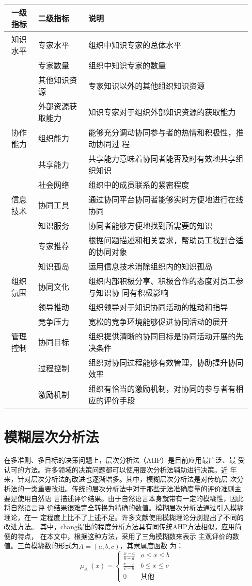 \documentclass[adobefonts]{ctexart}
\begin{document}
  \begin{supertabular}[center]{clp{6.5cm}}
\hline
    一级指标&二级指标&说明\\\hline
    知识水平&专家水平&组织中知识专家的总体水平\\
          &专家数量&组织中知识专家的数量    \\
          &其他知识资源&专家知识以外的其他组织知识资源\\
          &外部资源获取能力&知识专家对于组织外部知识资源的获取能力 \\
    协作能力&组织能力&能够充分调动协同参与者的热情和积极性，推动协同过
    程 \\
          &共享能力&共享能力意味着协同者能否及时有效地共享组织知识\\
          &社会网络&组织中的成员联系的紧密程度\\
    信息技术&协同工具&通过协同平台协同者能够实时方便地进行在线协同\\
          &知识服务&协同者能够方便地找到所需要的知识\\
          &专家推荐&根据问题描述和相关要求，帮助员工找到合适的协同对象\\
          &知识孤岛&运用信息技术消除组织内的知识孤岛\\
    组织氛围&协同文化&组织内部积极分享、积极合作的态度对员工参与知识协
    同有积极影响\\
          &领导推动&组织领导对于知识协同活动的推动和指导\\
          &竞争压力&宽松的竞争环境能够促进协同活动的展开\\
    管理控制&协同目标&组织提供清晰的协同目标是协同活动开展的先决条件\\
          &过程控制&组织对协同过程能够有效管理，协助提升协同效率\\
          &激励机制&组织有恰当的激励机制，对协同的参与者有相应的评价手段\\\hline
  \end{supertabular}

  \section{模糊层次分析法}

  在多准则、多目标的决策问题上，层次分析法（AHP）是目前应用最广泛、最
  受认可的方法。许多领域的决策问题都可以使用层次分析法辅助进行决策。近
  年来，针对层次分析法的改进也逐渐增多。其中，模糊层次分析法是对传统层
  次分析法的一类重要改进。传统的层次分析法中对于那些无法准确度量的评价准则主
  要是使用自然语
  言描述评价结果。由于自然语言本身就带有一定的模糊性，因此将自然语言评
  价结果很难完全转换为精确的数值。模糊层次分析法通过引入模糊理论，在一
  定程度上比不了上述不足。许多文献使用模糊理论分别提出了不同的改进方法。
  其中，chang提出的程度分析方法具有同传统AHP方法相似，应用简便的特点，
  在本文中，根据这种方法，采用了三角模糊数来表示
  主观评价的数值。三角模糊数的形式为$\tilde{A}=(a,b,c)$，其隶属度函数
  为：
  \[
  \mu_A~(x)=
  \left\{
      \begin{array}{ll}
        \frac{x-a}{b-a}&a\leq x \leq b\\
        \frac{c-x}{c-b}&b \leq x \leq c\\
        0 &　 \text{其他}
      \end{array}
    \right.
\]
\end{document}
